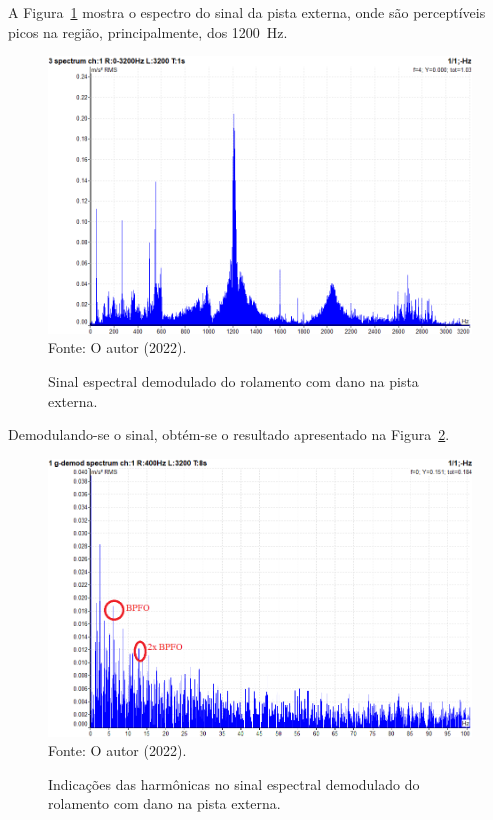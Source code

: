 \documentclass[
	12pt,				
	oneside,			
	a4paper,			
	english,			
	brazil,			
	]{abntex2ppgsi}
\begin{document}
A Figura~\ref{ESPECTRO_DEFEITO_EXTERNA_100HZ} mostra o espectro do sinal da pista externa, onde são perceptíveis picos na região, principalmente, dos \SI{1200}{\hertz}.  

\begin{figure}[H]
\centering
\caption {Sinal espectral demodulado do rolamento com dano na pista externa.}
\includegraphics[width=\textwidth,keepaspectratio]{ESPECTRO_DEFEITO_EXTERNA_100HZ} \\
Fonte: O autor (2022).
\label{ESPECTRO_DEFEITO_EXTERNA_100HZ}
\end{figure}
  
Demodulando-se o sinal, obtém-se o resultado apresentado na Figura~\ref{PISTA_EXTERNA_DEMODULADA_anotada}.
 
\begin{figure}[H]
\centering
\caption {Indicações das harmônicas no sinal espectral demodulado do rolamento com dano na pista externa.}
\includegraphics[width=\textwidth,keepaspectratio]{PISTA_EXTERNA_DEMODULADA_anotada} \\
Fonte: O autor (2022).
\label{PISTA_EXTERNA_DEMODULADA_anotada}
\end{figure} 
\end{document}
